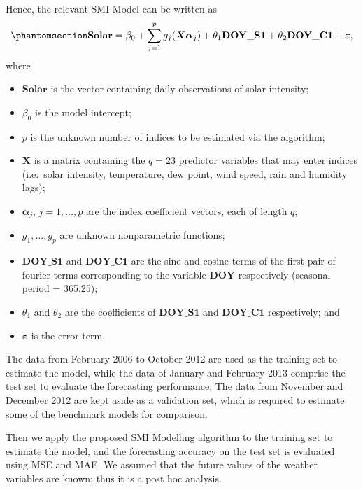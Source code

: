 \documentclass[
  11pt,
  a4paper,
]{article}
\providecommand{\tightlist}{%
  \setlength{\itemsep}{0pt}\setlength{\parskip}{0pt}}\usepackage{longtable,booktabs,array}
\begin{document}
Hence, the relevant SMI Model can be written as
\begin{equation}\phantomsection\label{eq-solar}{
  \textbf{Solar} = \beta_{0} + \sum_{j = 1}^{p}{g_{j}(\bm{X}\bm{\alpha}_{j})} + \theta_{1}\textbf{DOY}\_\textbf{S1} + \theta_{2}\textbf{DOY}\_\textbf{C1} + \bm{\varepsilon},
}\end{equation} where

\begin{itemize}
\tightlist
\item
  \(\textbf{Solar}\) is the vector containing daily observations of
  solar intensity;
\item
  \(\beta_{0}\) is the model intercept;
\item
  \(p\) is the unknown number of indices to be estimated via the
  algorithm;
\item
  \(\bm{X}\) is a matrix containing the \(q=23\) predictor variables
  that may enter indices (i.e.~solar intensity, temperature, dew point,
  wind speed, rain and humidity lags);
\item
  \(\bm{\alpha}_{j}\), \(j = 1, \dots, p\) are the index coefficient
  vectors, each of length \(q\);
\item
  \(g_{1}, \dots, g_{p}\) are unknown nonparametric functions;
\item
  \(\textbf{DOY}\_\textbf{S1}\) and \(\textbf{DOY}\_\textbf{C1}\) are
  the sine and cosine terms of the first pair of fourier terms
  corresponding to the variable \(\textbf{DOY}\) respectively (seasonal
  period = 365.25);
\item
  \(\theta_{1}\) and \(\theta_{2}\) are the coefficients of
  \(\textbf{DOY}\_\textbf{S1}\) and \(\textbf{DOY}\_\textbf{C1}\)
  respectively; and
\item
  \(\bm{\varepsilon}\) is the error term.
\end{itemize}

The data from February 2006 to October 2012 are used as the training set
to estimate the model, while the data of January and February 2013
comprise the test set to evaluate the forecasting performance. The data
from November and December 2012 are kept aside as a validation set,
which is required to estimate some of the benchmark models for
comparison.

Then we apply the proposed SMI Modelling algorithm to the training set
to estimate the model, and the forecasting accuracy on the test set is
evaluated using MSE and MAE. We assumed that the future values of the
weather variables are known; thus it is a post hoc analysis.
\end{document}
